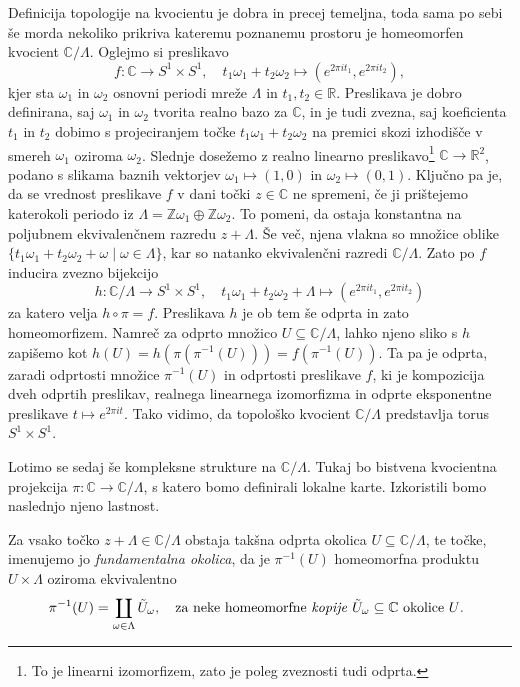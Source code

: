 \documentclass[mat1]{fmfdelo}
\numberwithin{equation}{section}
\newcommand{\R}{\mathbb R}
\newcommand{\Z}{\mathbb Z}
\newcommand{\C}{\mathbb C}
\newcommand{\om}{\omega}
\newcommand{\inv}{^{-1}}
\newcommand{\torus}{\C/\Lambda}
\theoremstyle{definition}
\begin{document}
Definicija topologije na kvocientu je dobra in precej temeljna, toda sama po sebi še morda nekoliko prikriva kateremu poznanemu prostoru je homeomorfen kvocient $\C/\Lambda$. Oglejmo si preslikavo 
\[ 
    f: \C \to S^1 \times S^1, \quad t_1\om_1 + t_2\om_2 \mapsto (e^{2 \pi i t_1}, e^{2 \pi i t_2}),
\]
kjer sta $\om_1$ in $\om_2$ osnovni periodi mreže $\Lambda$ in $t_1, t_2 \in \R$. Preslikava je dobro definirana, saj $\om_1$ in $\om_2$ tvorita realno bazo za $\C$, in je tudi zvezna, saj koeficienta $t_1$ in $t_2$ dobimo s projeciranjem točke $t_1\om_1 + t_2\om_2$ na premici skozi izhodišče v smereh $\om_1$ oziroma $\om_2$. Slednje dosežemo z realno linearno preslikavo\footnote{To je linearni izomorfizem, zato je poleg zveznosti tudi odprta.} $\C \to \R^2$, podano s slikama baznih vektorjev $\om_1 \mapsto (1,0)$ in $\om_2 \mapsto (0,1)$. Ključno pa je, da se vrednost preslikave $f$ v dani točki $z \in \C$ ne spremeni, če ji prištejemo katerokoli periodo iz $\Lambda = \Z\om_1 \oplus \Z\om_2$. To pomeni, da ostaja konstantna na poljubnem ekvivalenčnem razredu $z + \Lambda$. Še več, njena vlakna so množice oblike $\{t_1\om_1 + t_2\om_2 + \om \mid \om \in \Lambda\}$, kar so natanko ekvivalenčni razredi $\C/\Lambda$. Zato po \cite[Trditev...]{MrcunTop} $f$ inducira zvezno bijekcijo 
\[
    h: \C/\Lambda \to S^1 \times S^1, \quad t_1\om_1 + t_2\om_2 + \Lambda \mapsto (e^{2 \pi i t_1}, e^{2 \pi i t_2})
\]
za katero velja $h \circ \pi = f$. Preslikava $h$ je ob tem še odprta in zato homeomorfizem. Namreč za odprto množico $U\subseteq \C/\Lambda$, lahko njeno sliko s $h$ zapišemo kot $h(U) = h(\pi(\pi\inv(U))) = f(\pi\inv(U))$. Ta pa je odprta, zaradi odprtosti množice $\pi\inv(U)$ in odprtosti preslikave $f$, ki je kompozicija dveh odprtih preslikav, realnega linearnega izomorfizma in odprte eksponentne preslikave $t \mapsto e^{2\pi i t}$. Tako vidimo, da topološko kvocient $\C/\Lambda$ predstavlja torus $S^1 \times S^1$.


Lotimo se sedaj še kompleksne strukture na $\torus$. Tukaj bo bistvena kvocientna projekcija $\pi: \C \to \torus$, s katero bomo definirali lokalne karte. Izkoristili bomo naslednjo njeno lastnost. 

\begin{lema}
   Za vsako točko $z + \Lambda \in \torus$ obstaja takšna odprta okolica $U \subseteq \torus$, te točke, imenujemo jo \emph{fundamentalna okolica}, da je $\pi\inv(U)$ homeomorfna produktu $U \times \Lambda$ oziroma ekvivalentno 
   \[
        \pi\inv(U) = \coprod_{\om \in \Lambda} \tilde{U}_\om, \quad \text{za neke homeomorfne \emph{kopije} $\tilde{U}_\om \subseteq \C$ okolice $U$. } 
   \]
\end{lema}
\end{document}
